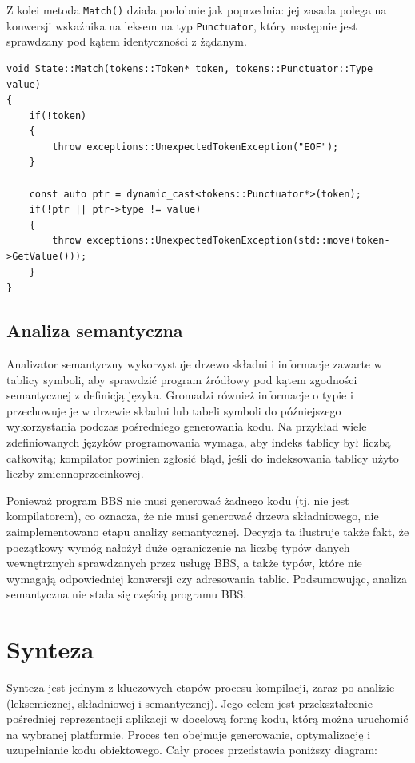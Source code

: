 Z kolei metoda \texttt{Match()} działa podobnie jak poprzednia: jej zasada polega na konwersji wskaźnika na leksem na typ \texttt{Punctuator}, który następnie jest sprawdzany pod kątem identyczności z żądanym.

\begin{lstlisting}[label=list:match,caption=Metoda State::Match(),basicstyle=\footnotesize\ttfamily]
void State::Match(tokens::Token* token, tokens::Punctuator::Type value)
{
    if(!token)
    {
        throw exceptions::UnexpectedTokenException("EOF");
    }
    
    const auto ptr = dynamic_cast<tokens::Punctuator*>(token);
    if(!ptr || ptr->type != value)
    {
        throw exceptions::UnexpectedTokenException(std::move(token->GetValue()));
    }
}
\end{lstlisting}

\subsection{Analiza semantyczna}

Analizator semantyczny wykorzystuje drzewo składni i informacje zawarte w tablicy symboli, aby sprawdzić program źródłowy pod kątem zgodności semantycznej z definicją języka. Gromadzi również informacje o typie i przechowuje je w drzewie składni lub tabeli symboli do późniejszego wykorzystania podczas pośredniego generowania kodu.
Na przykład wiele zdefiniowanych języków programowania wymaga, aby indeks tablicy był liczbą całkowitą; kompilator powinien zgłosić błąd, jeśli do indeksowania tablicy użyto liczby zmiennoprzecinkowej.

Ponieważ program BBS nie musi generować żadnego kodu (tj. nie jest kompilatorem), co oznacza, że nie musi generować drzewa składniowego, nie zaimplementowano etapu analizy semantycznej. Decyzja ta ilustruje także fakt, że początkowy wymóg nałożył duże ograniczenie na liczbę typów danych wewnętrznych sprawdzanych przez usługę BBS, a także typów, które nie wymagają odpowiedniej konwersji czy adresowania tablic. Podsumowując, analiza semantyczna nie stała się częścią programu BBS.

\section{Synteza}
Synteza jest jednym z kluczowych etapów procesu kompilacji, zaraz po analizie (leksemicznej, składniowej i semantycznej). Jego celem jest przekształcenie pośredniej reprezentacji aplikacji w docelową formę kodu, którą można uruchomić na wybranej platformie. Proces ten obejmuje generowanie, optymalizację i uzupełnianie kodu obiektowego. Cały proces przedstawia poniższy diagram:

